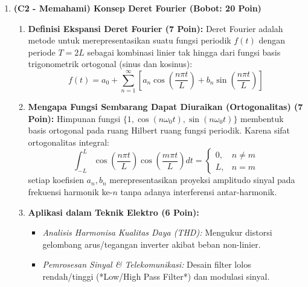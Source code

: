 \documentclass[11pt,a4paper]{article}
\begin{document}
\begin{enumerate}[label=\textbf{Soal \arabic*.}]
    \item \textbf{(C2 - Memahami) Konsep Deret Fourier (Bobot: 20 Poin)}
    \begin{tcolorbox}[colback=green!5!white,colframe=green!60!black,title=Solusi Model:]
    \begin{enumerate}[label=(\alph*)]
        \item \textbf{Definisi Ekspansi Deret Fourier (7 Poin):}
        Deret Fourier adalah metode untuk merepresentasikan suatu fungsi periodik $f(t)$ dengan periode $T = 2L$ sebagai kombinasi linier tak hingga dari fungsi basis trigonometrik ortogonal (sinus dan kosinus):
        $$ f(t) = a_0 + \sum_{n=1}^\infty \left[ a_n \cos\left(\frac{n\pi t}{L}\right) + b_n \sin\left(\frac{n\pi t}{L}\right) \right] $$
        \item \textbf{Mengapa Fungsi Sembarang Dapat Diuraikan (Ortogonalitas) (7 Poin):}
        Himpunan fungsi $\{1, \cos(n\omega_0 t), \sin(n\omega_0 t)\}$ membentuk basis ortogonal pada ruang Hilbert ruang fungsi periodik. Karena sifat ortogonalitas integral:
        $$ \int_{-L}^{L} \cos\left(\frac{n\pi t}{L}\right)\cos\left(\frac{m\pi t}{L}\right) dt = \begin{cases} 0, & n \ne m \\ L, & n = m \end{cases} $$
        setiap koefisien $a_n, b_n$ merepresentasikan proyeksi amplitudo sinyal pada frekuensi harmonik ke-$n$ tanpa adanya interferensi antar-harmonik.
        \item \textbf{Aplikasi dalam Teknik Elektro (6 Poin):}
        \begin{itemize}
            \item \textit{Analisis Harmonisa Kualitas Daya (THD):} Mengukur distorsi gelombang arus/tegangan inverter akibat beban non-linier.
            \item \textit{Pemrosesan Sinyal \& Telekomunikasi:} Desain filter lolos rendah/tinggi (*Low/High Pass Filter*) dan modulasi sinyal.
        \end{itemize}
    \end{enumerate}
    \end{tcolorbox}


\end{enumerate}
\end{document}
